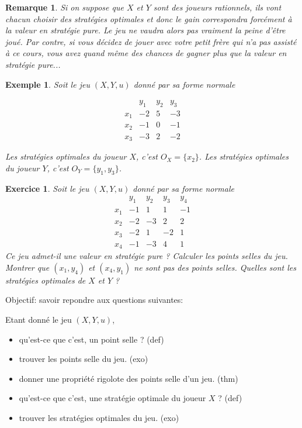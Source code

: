 \documentclass[11pt]{scrartcl}
\theoremstyle{mydefinition}
\newtheorem{exo}[definition]{Exercice}
\newtheorem{example}[definition]{Exemple}
\newtheorem{rem}[definition]{Remarque}
\theoremstyle{myplain}
\begin{document}
\begin{rem}
 Si on suppose que $X$ et $Y$ sont des joueurs rationnels, 
  ils vont chacun choisir des strat\'egies optimales et donc le gain 
  correspondra forc\'ement \`a la valeur en strat\'egie pure. 
 Le jeu ne vaudra alors pas vraiment la peine d'\^etre jou\'e. 
Par contre, si vous d\'ecidez de jouer avec votre petit fr\`ere qui n'a pas assist\'e \`a ce cours, 
vous avez quand m\^eme des chances de gagner plus que la valeur en strat\'egie pure...
\end{rem}


\begin{example}
  Soit le jeu $(X,Y,u)$ donn\'e par sa forme normale

  \[
\begin{array}{l|rrr}
    & y_1 & y_2 & y_3 \\ \hline
x_1 &  -2 & 5 & -3 \\ 
x_2 &  -1 & 0 & -1 \\
x_3 &  -3 & 2 & -2
\end{array}
\]

Les strat\'egies optimales du joueur $X$, c'est $O_X = \{x_2\}$.
Les strat\'egies optimales du joueur $Y$, c'est $O_Y = \{y_1, y_3\}$.

\end{example}

\begin{exo}\label{exo:points_selles}
  Soit le jeu $(X,Y,u)$ donn\'e par sa forme normale
  \[
\begin{array}{l|rrrr}
    & y_1 & y_2 & y_3 & y_4\\ \hline
x_1 &  -1 & 1 & 1 & -1 \\ 
x_2 &  -2 & -3 & 2 & 2 \\
x_3 &  -2 & 1 & -2 & 1 \\
x_4 &  -1 & -3 & 4 & 1
\end{array}
\]
Ce jeu admet-il une valeur en strat\'egie pure ? 
Calculer les points selles du jeu. 
Montrer que $(x_1,y_4)$ et $(x_4,y_1)$ ne sont pas des points selles.
Quelles sont les strat\'egies optimales de $X$ et $Y$ ?
\end{exo}



Objectif: savoir repondre aux questions suivantes:

Etant donn\'e le jeu $(X,Y,u)$, 
\begin{itemize}
 \item qu'est-ce que c'est, un point selle ? (def)
 \item trouver les points selle du jeu. (exo)
 \item donner une propri\'et\'e rigolote des points selle d'un jeu. (thm)
 \item qu'est-ce que c'est, une strat\'egie optimale du joueur $X$ ? (def)
 \item trouver les strat\'egies optimales du jeu. (exo)
                                           
\end{itemize}
\end{document}
